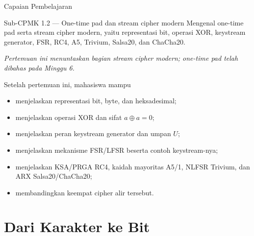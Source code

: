 \documentclass[aspectratio=169,11pt]{beamer}
\begin{document}
\begin{frame}{Capaian Pembelajaran}
    \begin{block}{Sub-CPMK 1.2 --- One-time pad dan stream cipher modern}
        \footnotesize
        Mengenal one-time pad serta stream cipher modern, yaitu representasi
        bit, operasi XOR, keystream generator, FSR, RC4, A5, Trivium,
        Salsa20, dan ChaCha20.
    \end{block}
    \vspace{0.1cm}
    {\scriptsize\itshape Pertemuan ini menuntaskan bagian stream cipher
    modern; one-time pad telah dibahas pada Minggu 6.}
    \vspace{0.15cm}
    \begin{exampleblock}{Setelah pertemuan ini, mahasiswa mampu}
        \footnotesize
        \begin{itemize}
            \item menjelaskan representasi bit, byte, dan heksadesimal;
            \item menjelaskan operasi XOR dan sifat $a\oplus a=0$;
            \item menjelaskan peran keystream generator dan umpan $U$;
            \item menjelaskan mekanisme FSR/LFSR beserta contoh keystream-nya;
            \item menjelaskan KSA/PRGA RC4, kaidah mayoritas A5/1,
                  NLFSR Trivium, dan ARX Salsa20/ChaCha20;
            \item membandingkan keempat cipher alir tersebut.
        \end{itemize}
    \end{exampleblock}
\end{frame}

\section{Dari Karakter ke Bit}
\end{document}
